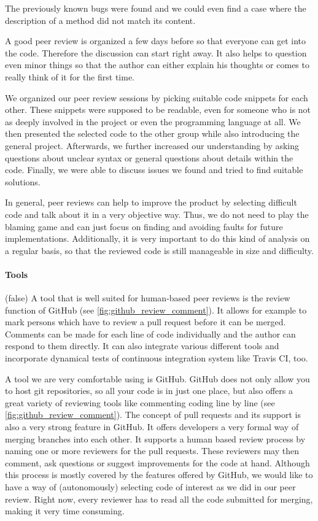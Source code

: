 \documentclass{scrartcl}
\begin{document}
The previously known bugs were found and we could even find a case where the description of a method did not match its content.

A good peer review is organized a few days before so that everyone can get into the code. Therefore the discussion can start right away. It also helps to question even minor things so that the author can either explain his thoughts or comes to really think of it for the first time.
\fi

We organized our peer review sessions by picking suitable code snippets for each other. These snippets were supposed to be readable, even for someone who is not as deeply involved in the project or even the programming language at all. We then presented the selected code to the other group while also introducing the general project. Afterwards, we further increased our understanding by asking questions about unclear syntax or general questions about details within the code. Finally, we were able to discuss issues we found and tried to find suitable solutions.

In general, peer reviews can help to improve the product by selecting difficult code and talk about it in a very objective way. Thus, we do not need to play the blaming game and can just focus on finding and avoiding faults for future implementations. Additionally, it is very important to do this kind of analysis on a regular basis, so that the reviewed code is still manageable in size and difficulty. 

\paragraph{Tools}

\if(false)
A tool that is well suited for human-based peer reviews is the review function of GitHub (see \vref{fig:github_review_comment}). It allows for example to mark persons which have to review a pull request before it can be merged. Comments can be made for each line of code individually and the author can respond to them directly. It can also integrate various different tools and incorporate dynamical tests of continuous integration system like Travis CI, too.
\fi

A tool we are very comfortable using is GitHub. GitHub does not only allow you to host git repositories, so all your code is in just one place, but also offers a great variety of reviewing tools like commenting coding line by line (see \vref{fig:github_review_comment}). The concept of pull requests and its support is also a very strong feature in GitHub. It offers developers a very formal way of merging branches into each other. It supports a human based review process by naming one or more reviewers for the pull requests. These reviewers may then comment, ask questions or suggest improvements for the code at hand. Although this process is mostly covered by the features offered by GitHub, we would like to have a way of (autonomously) selecting code of interest as we did in our peer review. Right now, every reviewer has to read all the code submitted for merging, making it very time consuming.
\end{document}

